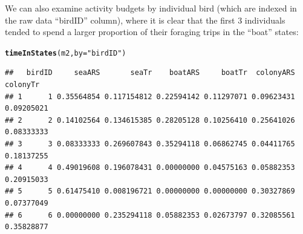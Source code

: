 \documentclass[12pt]{article}\usepackage[]{graphicx}\usepackage[]{xcolor}
\makeatletter
\newcommand{\hlsng}[1]{\textcolor[rgb]{0.192,0.494,0.8}{#1}}%
\newcommand{\hldef}[1]{\textcolor[rgb]{0.345,0.345,0.345}{#1}}%
\newcommand{\hlkwc}[1]{\textcolor[rgb]{0.333,0.667,0.333}{#1}}%
\newcommand{\hlkwd}[1]{\textcolor[rgb]{0.737,0.353,0.396}{\textbf{#1}}}%
\newenvironment{kframe}{%
 \def\at@end@of@kframe{}%
 \ifinner\ifhmode%
  \def\at@end@of@kframe{\end{minipage}}%
  \begin{minipage}{\columnwidth}%
 \fi\fi%
 \def\FrameCommand##1{\hskip\@totalleftmargin \hskip-\fboxsep
 \colorbox{shadecolor}{##1}\hskip-\fboxsep
     \hskip-\linewidth \hskip-\@totalleftmargin \hskip\columnwidth}%
 \MakeFramed {\advance\hsize-\width
   \@totalleftmargin\z@ \linewidth\hsize
   \@setminipage}}%
 {\par\unskip\endMakeFramed%
 \at@end@of@kframe}
\newenvironment{knitrout}{}{} %
\makeatother
\begin{document}
We can also examine activity budgets by individual bird (which are indexed in the raw data ``birdID'' column), where it is clear that the first 3 individuals tended to spend a larger proportion of their foraging trips in the ``boat'' states:
\begin{knitrout}
\color{fgcolor}\begin{kframe}
\begin{alltt}
\hlkwd{timeInStates}\hldef{(m2,} \hlkwc{by} \hldef{=} \hlsng{"birdID"}\hldef{)}
\end{alltt}
\end{kframe}
\end{knitrout}
\begin{knitrout}
\color{fgcolor}\begin{kframe}
\begin{verbatim}
##   birdID     seaARS       seaTr    boatARS     boatTr  colonyARS   colonyTr
## 1      1 0.35564854 0.117154812 0.22594142 0.11297071 0.09623431 0.09205021
## 2      2 0.14102564 0.134615385 0.28205128 0.10256410 0.25641026 0.08333333
## 3      3 0.08333333 0.269607843 0.35294118 0.06862745 0.04411765 0.18137255
## 4      4 0.49019608 0.196078431 0.00000000 0.04575163 0.05882353 0.20915033
## 5      5 0.61475410 0.008196721 0.00000000 0.00000000 0.30327869 0.07377049
## 6      6 0.00000000 0.235294118 0.05882353 0.02673797 0.32085561 0.35828877
\end{verbatim}
\end{kframe}
\end{knitrout}
\end{document}
